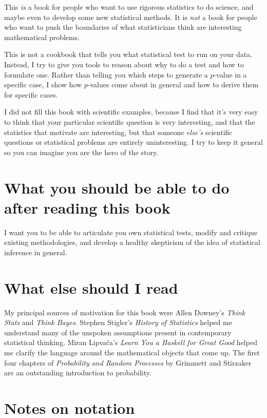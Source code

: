 This \emph{is} a book for people who want
to use rigorous statistics to do science, and maybe even to develop some
new statistical methods. It is \emph{not} a book for people who want to
push the boundaries of what statisticians think are interesting mathematical
problems.

This is not a cookbook that tells you what statistical test to run on your
data. Instead, I try to give you tools to reason about why to do a test and
how to formulate one. Rather than telling you which steps to generate a
$p$-value in a specific case, I show how $p$-values come about in general and
how to derive them for specific cases.

I did not fill this book with scientific examples, because I find that it's
very easy to think that your particular scientific question is very
interesting, and that the statistics that motivate are interesting, but that
someone \emph{else's} scientific questions or statistical problems are entirely
uninteresting. I try to keep it general so you can imagine you are the hero of the story.

\section*{What you should be able to do after reading this book}

I want you to be able to articulate you own statistical tests, modify
and critique existing methodologies, and develop a healthy skepticism of the
idea of statistical inference in general.

\section*{What else should I read}

My principal sources of motivation for this book were Allen Downey's
\textit{Think Stats} and \textit{Think Bayes}. Stephen Stigler's
\textit{History of Statistics} helped me understand many of the unspoken
assumptions present in contemporary statistical thinking. Miran Lipva\v{c}a's
\textit{Learn You a Haskell for Great Good} helped me clarify the language
around the mathematical objects that come up. The first four chapters of
\textit{Probability and Random Processes} by Grimmett and Stirzaker are an
outstanding introduction to probability.

\section*{Notes on notation}

